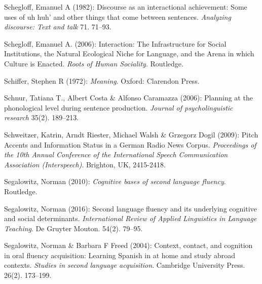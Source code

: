 \begin{styleBibliography}
Schegloff, Emanuel A (1982): Discourse as an interactional achievement: Some uses of {\textasciigrave}uh huh’ and other things that come between sentences. \textit{Analyzing discourse: Text and talk} 71. 71–93.
\end{styleBibliography}

\begin{styleBibliography}
Schegloff, Emanuel A. (2006): Interaction: The Infrastructure for Social Institutions, the Natural Ecological Niche for Language, and the Arena in which Culture is Enacted. \textit{Roots of Human Sociality}. Routledge.
\end{styleBibliography}

\begin{styleBibliography}
Schiffer, Stephen R (1972): \textit{Meaning}. Oxford: Clarendon Press.
\end{styleBibliography}

\begin{styleBibliography}
Schnur, Tatiana T., Albert Costa \& Alfonso Caramazza (2006): Planning at the phonological level during sentence production. \textit{Journal of psycholinguistic research} 35(2). 189–213.
\end{styleBibliography}

\begin{styleBibliography}
Schweitzer, Katrin, Arndt Riester, Michael Walsh \& Grzegorz Dogil (2009): Pitch Accents and Information Status in a German Radio News Corpus. \textit{Proceedings of the 10th Annual Conference of the International Speech Communication Association (Interspeech)}. Brighton, UK, 2415-2418.
\end{styleBibliography}

\begin{styleBibliography}
Segalowitz, Norman (2010): \textit{Cognitive bases of second language fluency}. Routledge.
\end{styleBibliography}

\begin{styleBibliography}
Segalowitz, Norman (2016): Second language fluency and its underlying cognitive and social determinants. \textit{International Review of Applied Linguistics in Language Teaching}. De Gruyter Mouton. 54(2). 79–95.
\end{styleBibliography}

\begin{styleBibliography}
Segalowitz, Norman \& Barbara F Freed (2004): Context, contact, and cognition in oral fluency acquisition: Learning Spanish in at home and study abroad contexts. \textit{Studies in second language acquisition}. Cambridge University Press. 26(2). 173–199.
\end{styleBibliography}

